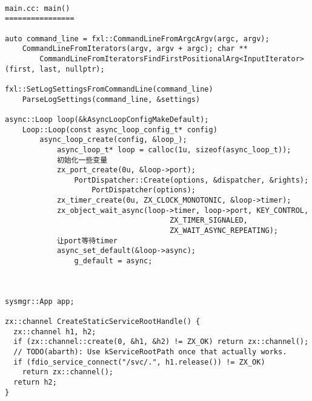 \begin{verbatim}

main.cc: main()
================

auto command_line = fxl::CommandLineFromArgcArgv(argc, argv);
    CommandLineFromIterators(argv, argv + argc); char **
        CommandLineFromIteratorsFindFirstPositionalArg<InputIterator>(first, last, nullptr);

fxl::SetLogSettingsFromCommandLine(command_line)
    ParseLogSettings(command_line, &settings)

async::Loop loop(&kAsyncLoopConfigMakeDefault);
    Loop::Loop(const async_loop_config_t* config)
        async_loop_create(config, &loop_);
            async_loop_t* loop = calloc(1u, sizeof(async_loop_t));
            初始化一些变量
            zx_port_create(0u, &loop->port);
                PortDispatcher::Create(options, &dispatcher, &rights);
                    PortDispatcher(options);
            zx_timer_create(0u, ZX_CLOCK_MONOTONIC, &loop->timer);     
            zx_object_wait_async(loop->timer, loop->port, KEY_CONTROL,
                                      ZX_TIMER_SIGNALED,
                                      ZX_WAIT_ASYNC_REPEATING);
            让port等待timer
            async_set_default(&loop->async);
                g_default = async;



sysmgr::App app;

zx::channel CreateStaticServiceRootHandle() {
  zx::channel h1, h2;
  if (zx::channel::create(0, &h1, &h2) != ZX_OK) return zx::channel();
  // TODO(abarth): Use kServiceRootPath once that actually works.
  if (fdio_service_connect("/svc/.", h1.release()) != ZX_OK)
    return zx::channel();
  return h2;
}


\end{verbatim}
